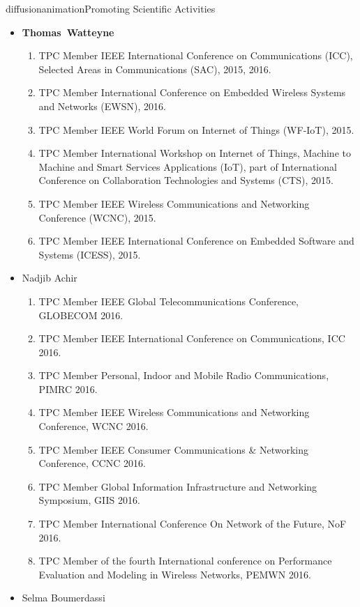 \documentclass{ra2016}
\newcommand{\thomas}  {\textbf{Thomas~Watteyne}}
\begin{document}
\begin{module}{diffusion}{animation}{Promoting Scientific Activities}
\begin{itemize}
    \item \thomas
        \begin{enumerate}
            \item TPC Member IEEE International Conference on Communications (ICC), Selected Areas in Communications (SAC), 2015, 2016.
            \item TPC Member International Conference on Embedded Wireless Systems and Networks (EWSN), 2016.
            \item TPC Member IEEE World Forum on Internet of Things (WF-IoT), 2015.
            \item TPC Member International Workshop on Internet of Things, Machine to Machine and Smart Services Applications (IoT), part of International Conference on  Collaboration Technologies and Systems (CTS), 2015.
            \item TPC Member IEEE Wireless Communications and Networking Conference (WCNC), 2015.
            \item TPC Member IEEE International Conference on Embedded Software and Systems (ICESS), 2015.
        \end{enumerate}
    \item Nadjib Achir
        \begin{enumerate}
            \item TPC Member IEEE Global Telecommunications Conference, GLOBECOM 2016.
            \item TPC Member IEEE International Conference on Communications, ICC 2016.
            \item TPC Member Personal, Indoor and Mobile Radio Communications, PIMRC 2016.
            \item TPC Member IEEE Wireless Communications and Networking Conference, WCNC 2016.
            \item TPC Member IEEE Consumer Communications \& Networking Conference, CCNC 2016.
            \item TPC Member Global Information Infrastructure and Networking Symposium, GIIS 2016.               
            \item TPC Member International Conference On Network of the Future, NoF 2016.     
            \item TPC Member of the fourth International conference on Performance Evaluation and Modeling in Wireless Networks, PEMWN 2016.     
        \end{enumerate}
    \item Selma Boumerdassi
        \begin{enumerate}      		

\end{enumerate}
\end{itemize}
\end{module}
\end{document}
